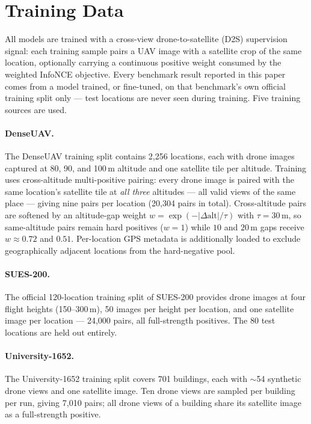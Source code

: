 \documentclass[conference]{IEEEtran}
\begin{document}
\section{Training Data}
\label{sec:training_data}
All models are trained with a cross-view drone-to-satellite (D2S)
supervision signal: each training sample pairs a UAV image with a satellite
crop of the same location, optionally carrying a continuous positive weight
consumed by the weighted InfoNCE objective. Every benchmark result reported
in this paper comes from a model trained, or fine-tuned, on that benchmark's
own official training split only — test locations are never seen during
training. Five training sources are used.

\paragraph{DenseUAV.}
The DenseUAV training split \cite{dai2024denseuav} contains 2,256 locations,
each with drone images captured at 80, 90, and 100\,m altitude and one
satellite tile per altitude. Training uses cross-altitude multi-positive
pairing: every drone image is paired with the same location's satellite tile
at \emph{all three} altitudes — all valid views of the same place — giving
nine pairs per location (20,304 pairs in total). Cross-altitude pairs are
softened by an altitude-gap weight $w=\exp(-|\Delta \mathrm{alt}|/\tau)$
with $\tau=30$\,m, so same-altitude pairs remain hard positives ($w{=}1$)
while $10$ and $20$\,m gaps receive $w{\approx}0.72$ and $0.51$.
Per-location GPS metadata is additionally loaded to exclude geographically
adjacent locations from the hard-negative pool.

\paragraph{SUES-200.}
The official 120-location training split of SUES-200 \cite{zhu2023sues}
provides drone images at four flight heights (150--300\,m), 50 images per
height per location, and one satellite image per location — 24,000 pairs,
all full-strength positives. The 80 test locations are held out entirely.

\paragraph{University-1652.}
The University-1652 training split \cite{zheng2020university1652} covers 701
buildings, each with $\sim$54 synthetic drone views and one satellite image.
Ten drone views are sampled per building per run, giving 7,010 pairs; all
drone views of a building share its satellite image as a full-strength
positive.
\end{document}
